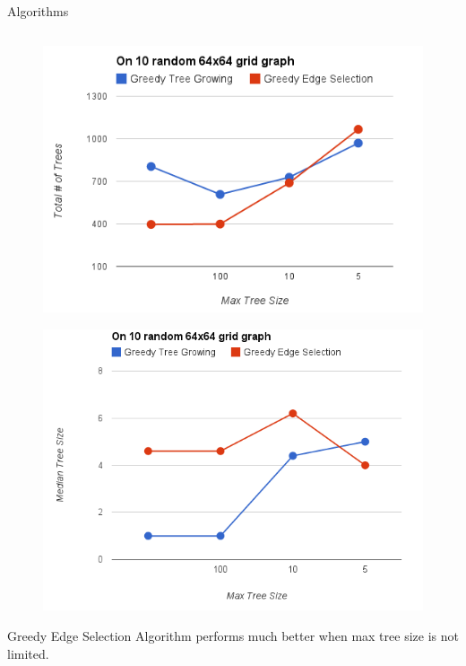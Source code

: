 \documentclass[serif,mathserif,final]{beamer}
\begin{document}
\begin{frame}{}
\begin{columns}[t]
\begin{column}{0.49\linewidth}
\begin{block}{\Huge Algorithms}
\begin{columns}[t]
\begin{column}{0.51\linewidth}
\begin{figure}
	\centering
	\includegraphics[width=\columnwidth]{TotalTrees-Vs-MaxTreeSize.png}
\end{figure}

\begin{figure}
	\centering
	\includegraphics[width=\columnwidth]{MedianTreeSize-Vs-MaxTreeSize.png}
\end{figure}

			
				{\huge
					Greedy Edge Selection Algorithm performs
					much better when max tree size is not limited. 
					\vspace{0.3in}

}
\end{column}
\end{columns}
\end{block}
\end{column}
\end{columns}
\end{frame}
\end{document}
